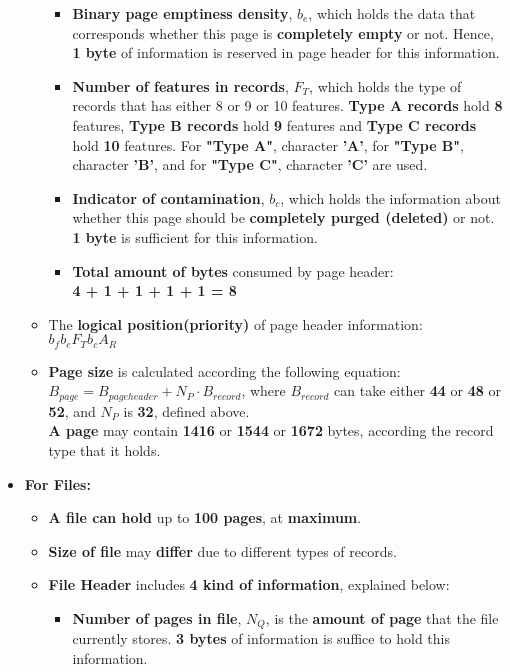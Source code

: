 \documentclass[12pt]{report}
\begin{document}
\begin{itemize}
\begin{itemize}
\begin{itemize}
\item \textbf{Binary page emptiness density}, $b_e$, which holds the data that corresponds whether this page is \textbf{completely empty} or not. Hence, \textbf{1 byte} of information is reserved in page header for this information.
\item \textbf{Number of features in records}, $F_T$, which holds the type of records that has either 8 or 9 or 10 features. \textbf{Type A records} hold \textbf{8} features, \textbf{Type B records} hold \textbf{9} features and \textbf{Type C records} hold \textbf{10} features. For \textbf{"Type A"}, character \textbf{'A'}, for \textbf{"Type B"}, character \textbf{'B'}, and for \textbf{"Type C"}, character \textbf{'C'} are used.
\item \textbf{Indicator of contamination}, $b_c$, which holds the information about whether this page should be \textbf{completely purged (deleted)} or not. \textbf{1 byte} is sufficient for this information.
\item \textbf{Total amount of bytes} consumed by page header: \\
\textbf{4 + 1 + 1 + 1 + 1 = 8}
\end{itemize}
\item The \textbf{logical position(priority)} of page header information: \\
${b}_{f}{b}_{e}{F}_{T}{b}_{c}{A}_{R}$
\item \textbf{Page size} is calculated according the following equation: \\
{\large $B_{page} = B_{pageheader} + {N_P}\cdot{B_{record}}$}, where $B_{record}$ can take either \textbf{44} or \textbf{48} or \textbf{52}, and ${N}_{P}$ is \textbf{32}, defined above. \\
\textbf{A page} may contain \textbf{1416} or \textbf{1544} or \textbf{1672} bytes, according the record type that it holds.
\end{itemize}
\newpage
\item {\large \textbf{For Files:}}
\begin{itemize}
\item \textbf{A file can hold} up to \textbf{100 pages}, at \textbf{maximum}.
\item \textbf{Size of file} may \textbf{differ} due to different types of records.
\item \textbf{File Header} includes \textbf{4 kind of information}, explained below:
\begin{itemize}
\item \textbf{Number of pages in file}, $N_Q$, is the \textbf{amount of page} that the file currently stores. \textbf{3 bytes} of information is suffice to hold this information.

\end{itemize}
\end{itemize}
\end{itemize}
\end{document}
